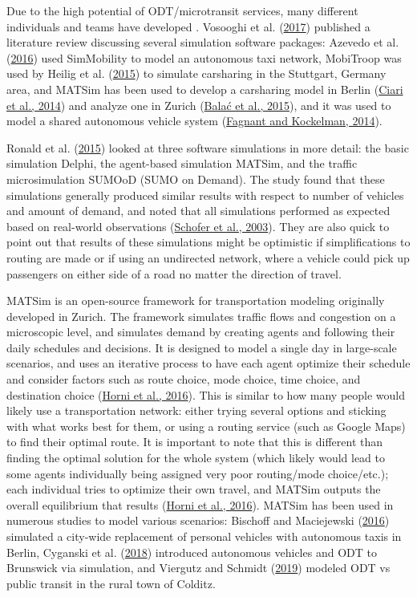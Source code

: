 \documentclass[
]{report}
\begin{document}
Due to the high potential of ODT/microtransit services, many different individuals and teams have developed . Vosooghi et al. (\protect\hyperlink{ref-Vosooghi2017}{2017}) published a literature review discussing several simulation software packages: Azevedo et al. (\protect\hyperlink{ref-Azevedo2016}{2016}) used SimMobility to model an autonomous taxi network, MobiTroop was used by Heilig et al. (\protect\hyperlink{ref-Heilig2015}{2015}) to simulate carsharing in the Stuttgart, Germany area, and MATSim has been used to develop a carsharing model in Berlin (\protect\hyperlink{ref-Ciari2014}{Ciari et al., 2014}) and analyze one in Zurich (\protect\hyperlink{ref-Balac2015}{Balać et al., 2015}), and it was used to model a shared autonomous vehicle system (\protect\hyperlink{ref-Fagnant2014}{Fagnant and Kockelman, 2014}).

Ronald et al. (\protect\hyperlink{ref-Ronald2015}{2015}) looked at three software simulations in more detail: the basic simulation Delphi, the agent-based simulation MATSim, and the traffic microsimulation SUMOoD (SUMO on Demand). The study found that these simulations generally produced similar results with respect to number of vehicles and amount of demand, and noted that all simulations performed as expected based on real-world observations (\protect\hyperlink{ref-Schofer2003}{Schofer et al., 2003}). They are also quick to point out that results of these simulations might be optimistic if simplifications to routing are made or if using an undirected network, where a vehicle could pick up passengers on either side of a road no matter the direction of travel.

MATSim is an open-source framework for transportation modeling originally developed in Zurich. The framework simulates traffic flows and congestion on a microscopic level, and simulates demand by creating agents and following their daily schedules and decisions. It is designed to model a single day in large-scale scenarios, and uses an iterative process to have each agent optimize their schedule and consider factors such as route choice, mode choice, time choice, and destination choice (\protect\hyperlink{ref-Horni2016}{Horni et al., 2016}). This is similar to how many people would likely use a transportation network: either trying several options and sticking with what works best for them, or using a routing service (such as Google Maps) to find their optimal route. It is important to note that this is different than finding the optimal solution for the whole system (which likely would lead to some agents individually being assigned very poor routing/mode choice/etc.); each individual tries to optimize their own travel, and MATSim outputs the overall equilibrium that results (\protect\hyperlink{ref-Horni2016}{Horni et al., 2016}). MATSim has been used in numerous studies to model various scenarios: Bischoff and Maciejewski (\protect\hyperlink{ref-Bischoff2016}{2016}) simulated a city-wide replacement of personal vehicles with autonomous taxis in Berlin, Cyganski et al. (\protect\hyperlink{ref-Cyganski2018}{2018}) introduced autonomous vehicles and ODT to Brunswick via simulation, and Viergutz and Schmidt (\protect\hyperlink{ref-Viergutz2019}{2019}) modeled ODT vs public transit in the rural town of Colditz.
\end{document}
